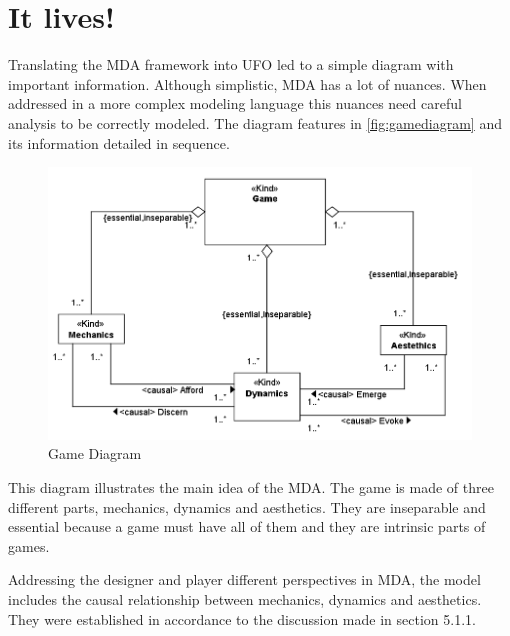 \section{It lives!}


Translating the MDA framework into UFO led to a simple diagram with important information. Although simplistic, MDA has a lot of nuances. When addressed in a more complex modeling language this nuances need careful analysis to be correctly modeled. The diagram features in \autoref{fig:gamediagram} and its information detailed in sequence.

\begin{figure}[!h]
    \centering
    \includegraphics[scale=0.65]{Images/Model/Game.png}
    \caption{Game Diagram}
    \label{fig:gamediagram}
\end{figure}

This diagram illustrates the main idea of the MDA. The game is made of three different parts, mechanics, dynamics and aesthetics. They are inseparable and essential because a game must have all of them and they are intrinsic parts of games.

Addressing the designer and player different perspectives in MDA, the model includes the causal relationship between mechanics, dynamics and aesthetics. They were established in accordance to the discussion made in section 5.1.1.
